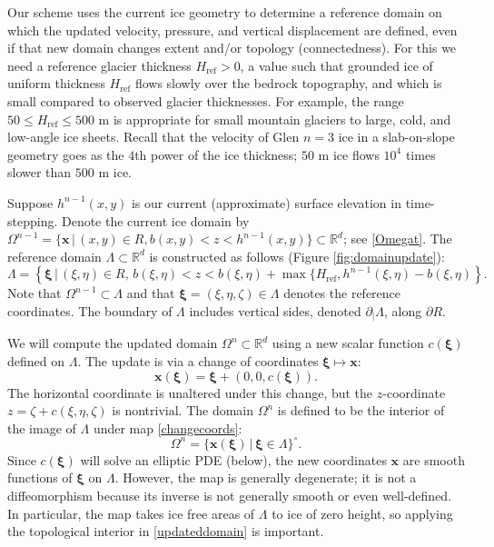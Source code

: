 \documentclass[letterpaper,final,12pt,reqno]{amsart}
\newcommand{\RR}{\mathbb{R}}
\newcommand{\bx}{\mathbf{x}}
\newcommand{\bxi}{\bm{\xi}}
\newcommand{\Href}{H_{\text{ref}}}
\begin{document}
Our scheme uses the current ice geometry to determine a reference domain on which the updated velocity, pressure, and vertical displacement are defined, even if that new domain changes extent and/or topology (connectedness).  For this we need a reference glacier thickness $\Href>0$, a value such that grounded ice of uniform thickness $\Href$ flows slowly over the bedrock topography, and which is small compared to observed glacier thicknesses.  For example, the range $50 \le \Href \le 500$ m is appropriate for small mountain glaciers to large, cold, and low-angle ice sheets.  Recall that the velocity of Glen $n=3$ ice in a slab-on-slope geometry \cite{GreveBlatter2009} goes as the $4$th power of the ice thickness; $50$ m ice flows $10^4$ times slower than $500$ m ice.

Suppose $h^{n-1}(x,y)$ is our current (approximate) surface elevation in time-stepping.  Denote the current ice domain by $\Omega^{n-1}=\{\bx\,\big|\,(x,y)\in R, b(x,y)<z<h^{n-1}(x,y)\} \subset \RR^d$; see \eqref{Omegat}.  The reference domain $\Lambda \subset \RR^d$ is constructed as follows (Figure \ref{fig:domainupdate}):
\begin{equation}
\Lambda = \left\{\bxi\,\big|\,(\xi,\eta)\in R, \, b(\xi,\eta) < z < b(\xi,\eta) + \max\{\Href,h^{n-1}(\xi,\eta)-b(\xi,\eta)\right\}.  \label{Lambda}
\end{equation}
Note that $\Omega^{n-1} \subset \Lambda$ and that $\bxi=(\xi,\eta,\zeta) \in \Lambda$ denotes the reference coordinates.  The boundary of $\Lambda$ includes vertical sides, denoted $\partial_{|} \Lambda$, along $\partial R$.

We will compute the updated domain $\Omega^n \subset \RR^d$ using a new scalar function $c(\bxi)$ defined on $\Lambda$.  The update is via a change of coordinates $\bxi \mapsto \bx$:
\begin{equation}
\bx(\bxi) = \bxi + (0,0,c(\bxi)). \label{changecoords}
\end{equation}
The horizontal coordinate is unaltered under this change, but the $z$-coordinate $z=\zeta+c(\xi,\eta,\zeta)$ is nontrivial.  The domain $\Omega^n$ is defined to be the interior of the image of $\Lambda$ under map \eqref{changecoords}:
\begin{equation}
\Omega^n = \{\bx(\bxi) \,\big|\, \bxi \in \Lambda\}^\circ. \label{updateddomain}
\end{equation}
Since $c(\bxi)$ will solve an elliptic PDE (below), the new coordinates $\bx$ are smooth functions of $\bxi$ on $\Lambda$.  However, the map is generally degenerate; it is not a diffeomorphism because its inverse is not generally smooth or even well-defined.  In particular, the map takes ice free areas of $\Lambda$ to ice of zero height, so applying the topological interior in \eqref{updateddomain} is important.
\end{document}
